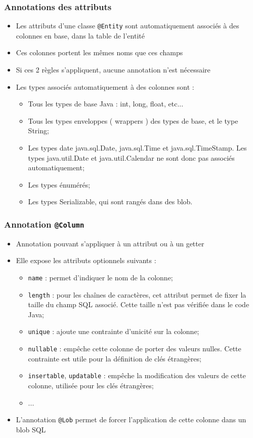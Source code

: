 \documentclass[aspectratio=169,10pt]{beamer}
\begin{document}
\begin{frame}
	\frametitle{Annotations des attributs}
	
	\begin{itemize}
		\item  Les attributs d'une classe \texttt{@Entity} sont automatiquement associés à des colonnes en base, dans la table de l'entité
		\item Ces colonnes portent les mêmes noms que ces champs
		\item Si ces 2 règles s'appliquent, aucune annotation n'est nécessaire
		\item Les types associés automatiquement à des colonnes sont :
		\begin{itemize}
			\item Tous les types de base Java : int, long, float, etc...
			\item Tous les types enveloppes ( wrappers ) des types de base, et le type String;
			\item Les types date java.sql.Date, java.sql.Time et java.sql.TimeStamp. Les types java.util.Date et java.util.Calendar ne sont donc pas associés automatiquement;
			\item Les types énumérés;
			\item Les types Serializable, qui sont rangés dans des blob.
		\end{itemize}
		
	\end{itemize}
	
\end{frame}

\begin{frame}
	\frametitle{Annotation \texttt{@Column}}
	
	\begin{itemize}
		\item Annotation pouvant s'appliquer à un attribut ou à un getter
		\item Elle expose les attributs optionnels suivants :
		\begin{itemize}
			\item \texttt{name} : permet d'indiquer le nom de la colonne;
			\item \texttt{length} : pour les chaînes de caractères, cet attribut permet de fixer la taille du champ SQL associé. Cette taille n'est pas vérifiée dans le code Java;
			\item \texttt{unique} : ajoute une contrainte d'unicité sur la colonne;
			\item \texttt{nullable} : empêche cette colonne de porter des valeurs nulles. Cette contrainte est utile pour la définition de clés étrangères;
			\item \texttt{insertable}, \texttt{updatable} : empêche la modification des valeurs de cette colonne, utilisée pour les clés étrangères;
			\item ...
		\end{itemize}
		\item L'annotation \texttt{@Lob} permet de forcer l'application de cette colonne dans un blob SQL
	\end{itemize}
	
\end{frame}
\end{document}
